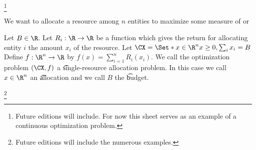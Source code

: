 
  \ifhmode\unskip\fi\footnote{
Future editions will include. For now this sheet serves as an example of a continuous optimization problem.
  }


We want to allocate a resource among $n$ entities to maximize some measure of  or 

Let $B \in \R $.
Let $R_i: \R  \to \R $ be a function which gives the return for allocating entity $i$ the amount $x_i$ of the resource.
Let $\CX = \Set*{x \in \R ^n}{x \geq 0, \sum_{i}x_i = B}$
Define $f: \R ^n \to \R $ by $f(x) = \sum_{i = 1}^{n} R_i(x_i)$.
We call the optimization problem $(\CX, f)$ a \t{single-resource allocation problem}.
In this case we call $x \in \R ^{n}$ an \t{allocation} and we call $B$ the \t{budget}.

  \ifhmode\unskip\fi\footnote{
Future editions will include the numerous examples.
  }

\blankpage


